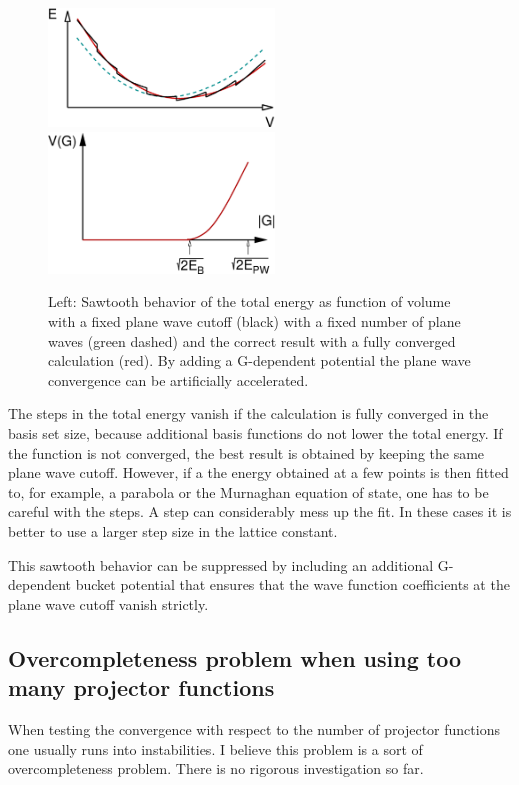 \documentclass[final,12pt]{article}
\begin{document}
{{{{{{\begin{figure}[h!]
\includegraphics[width=6cm]{Figs/Sawtooth/sawtooth.eps}
\includegraphics[width=6cm]{Figs/Gbucket/gbucket.eps}
\label{fig:sawtooth}
\caption{Left: Sawtooth behavior of the total energy as function of
volume with a fixed plane wave cutoff (black) with a fixed number of
plane waves (green dashed) and the correct result with a fully
converged calculation (red). By adding a G-dependent potential the
plane wave convergence can be artificially accelerated.}
\end{figure}

The steps in the total energy vanish if the calculation is fully converged in
the basis set size, because additional basis functions do not lower the total
energy. If the function is not converged, the best result is obtained by
keeping the same plane wave cutoff. However, if a the energy obtained at a few
points is then fitted to, for example, a parabola or the Murnaghan equation of
state\cite{murnaghan44_pnas30_244}, one has to be careful with the steps. A
step can considerably mess up the fit. In these cases it is better to use a
larger step size in the lattice constant.

This sawtooth behavior can be suppressed by including an additional
G-dependent bucket potential that ensures that the wave function
coefficients at the plane wave cutoff vanish strictly.

\subsection{Overcompleteness problem when using too many projector functions}
When testing the convergence with respect to the number of projector
functions one usually runs into instabilities. I believe this problem
is a sort of overcompleteness problem. There is no rigorous
investigation so far.

}}}}}}
\end{document}
